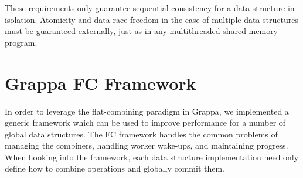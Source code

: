 


These requirements only guarantee sequential consistency for a data structure in isolation. Atomicity and data race freedom in the case of multiple data structures must be guaranteed externally, just as in any multithreaded shared-memory program.

\section{Grappa FC Framework}
In order to leverage the flat-combining paradigm in Grappa, we implemented a generic framework which can be used to improve performance for a number of global data structures. The FC framework handles the common problems of managing the combiners, handling worker wake-ups, and maintaining progress. When hooking into the framework, each data structure implementation need only define how to combine operations and globally commit them.


